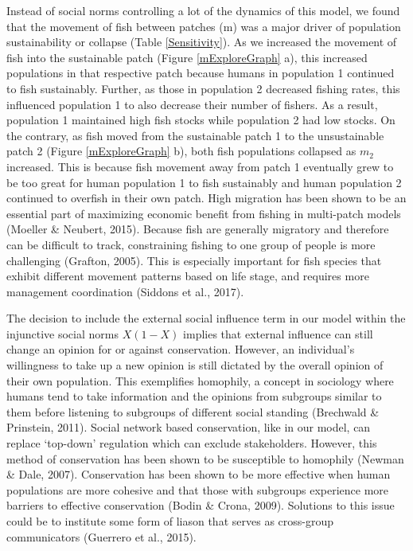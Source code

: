 \documentclass[
  12pt,
]{article}
\begin{document}
Instead of social norms controlling a lot of the dynamics of this model, we found that the movement of fish between patches (m) was a major driver of population sustainability or collapse (Table \ref{Sensitivity}). As we increased the movement of fish into the sustainable patch (Figure \ref{mExploreGraph} a), this increased populations in that respective patch because humans in population 1 continued to fish sustainably. Further, as those in population 2 decreased fishing rates, this influenced population 1 to also decrease their number of fishers. As a result, population 1 maintained high fish stocks while population 2 had low stocks. On the contrary, as fish moved from the sustainable patch 1 to the unsustainable patch 2 (Figure \ref{mExploreGraph} b), both fish populations collapsed as \(m_2\) increased. This is because fish movement away from patch 1 eventually grew to be too great for human population 1 to fish sustainably and human population 2 continued to overfish in their own patch. High migration has been shown to be an essential part of maximizing economic benefit from fishing in multi-patch models (Moeller \& Neubert, 2015). Because fish are generally migratory and therefore can be difficult to track, constraining fishing to one group of people is more challenging (Grafton, 2005). This is especially important for fish species that exhibit different movement patterns based on life stage, and requires more management coordination (Siddons et al., 2017).

The decision to include the external social influence term in our model within the injunctive social norms \(X(1-X)\) implies that external influence can still change an opinion for or against conservation. However, an individual's willingness to take up a new opinion is still dictated by the overall opinion of their own population. This exemplifies homophily, a concept in sociology where humans tend to take information and the opinions from subgroups similar to them before listening to subgroups of different social standing (Brechwald \& Prinstein, 2011). Social network based conservation, like in our model, can replace `top-down' regulation which can exclude stakeholders. However, this method of conservation has been shown to be susceptible to homophily (Newman \& Dale, 2007). Conservation has been shown to be more effective when human populations are more cohesive and that those with subgroups experience more barriers to effective conservation (Bodin \& Crona, 2009). Solutions to this issue could be to institute some form of liason that serves as cross-group communicators (Guerrero et al., 2015).
\end{document}
